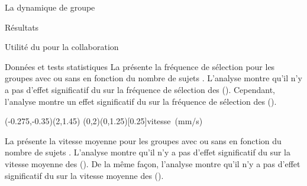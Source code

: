 \documentclass[myfrancais]{mythesis}
\begin{document}
\begin{mychapter}{La dynamique de groupe}
\begin{mysection}{Résultats}
\begin{mysubsection}{Utilité du \mybrainstorming pour la collaboration}
\begin{mysubsubsection}{Données et tests statistiques}
					La  présente la fréquence de sélection  pour les groupes avec ou sans \mybrainstorming {} en fonction du nombre de sujets .
					L'analyse montre qu'il n'y a pas d'effet significatif du \mybrainstorming {} sur la fréquence de sélection  des  ().
					Cependant, l'analyse montre un effet significatif du \mybrainstorming {} sur la fréquence de sélection  des  ().

					\begin{myfigure}
						\begin{myps}(-0.275,-0.35)(2,1.45)
							\myaxes(0,2){\mybrainstorming}(0,1.25)[0.25]{vitesse~(mm/s)}
						\end{myps}
					\end{myfigure}

					La  présente la vitesse moyenne  pour les groupes avec ou sans \mybrainstorming {} en fonction du nombre de sujets .
					L'analyse montre qu'il n'y a pas d'effet significatif du \mybrainstorming {} sur la vitesse moyenne  des  ().
					De la même façon, l'analyse montre qu'il n'y a pas d'effet significatif du \mybrainstorming {} sur la vitesse moyenne  des  ().


\end{mysubsubsection}
\end{mysubsection}
\end{mysection}
\end{mychapter}
\end{document}
